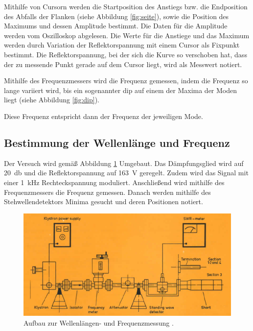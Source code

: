 Mithilfe von Cursorn werden die Startposition des Anstiegs bzw. die Endposition
des Abfalls der Flanken (siehe Abbildung \ref{fig:seite}), sowie die Position des
Maximums und dessen Amplitude bestimmt. Die Daten für die Amplitude werden vom
Oszilloskop abgelesen. Die Werte für die Anstiege und das Maximum werden durch
Variation der Reflektorspannung mit einem Cursor als Fixpunkt bestimmt. Die Reflektorspannung,
bei der sich die Kurve so verschoben hat, dass der zu messende Punkt gerade auf dem
Cursor liegt, wird als Messwert notiert.


Mithilfe des Frequenzmessers wird die Frequenz gemessen, indem die Frequenz so lange variiert wird, bis ein
sogenannter dip auf einem der Maxima der Moden liegt (siehe Abbildung \ref{fig:dip}).


Diese Frequenz entspricht dann der Frequenz der jeweiligen Mode.

\subsection{Bestimmung der Wellenlänge und Frequenz}
\label{subsec:frequenz}
Der Versuch wird gemäß Abbildung \ref{fig:aufbau_frequenz} Umgebaut. Das Dämpfungsglied
wird auf \SI{20}{\decibel} und die Reflektorspannung auf \SI{163}{\volt} geregelt. Zudem wird das
Signal mit einer \SI{1}{\kilo\hertz} Rechteckspannung moduliert. Anschließend wird
mithilfe des Frequenzmessers die Frequenz gemessen. Danach werden mithilfe des
Stehwellendetektors Minima gesucht und deren Positionen notiert.

\begin{figure}
  \centering
  \includegraphics[width=\textwidth]{data/aufbau_frequenz.png}
  \caption{Aufbau zur Wellenlängen- und Frequenzmessung \cite{Versuchsanleitung_alt}.}
  \label{fig:aufbau_frequenz}
\end{figure}


